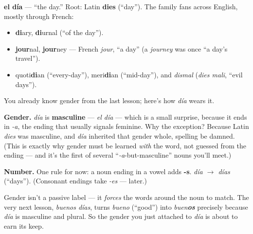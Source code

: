 \begin{cousinweb}
\textbf{el día} — \textquotedblleft{}the day.\textquotedblright{} Root: Latin \textbf{dies} (\textquotedblleft{}day\textquotedblright{}). The family fans across English, mostly through French:

\begin{itemize}
\raggedright
  \item \textbf{di}ary, \textbf{di}urnal (\textquotedblleft{}of the day\textquotedblright{}).
  \item \textbf{jour}nal, \textbf{jour}ney — French \emph{jour}, \textquotedblleft{}a day\textquotedblright{} (a \emph{journey} was once \textquotedblleft{}a day's travel\textquotedblright{}).
  \item quoti\textbf{di}an (\textquotedblleft{}every-day\textquotedblright{}), meri\textbf{di}an (\textquotedblleft{}mid-day\textquotedblright{}), and \emph{dismal} (\emph{dies mali}, \textquotedblleft{}evil days\textquotedblright{}).
\end{itemize}
\end{cousinweb}

\begin{grammarlens}[title={Its two tags: gender and number}]
You already know gender from the last lesson; here's how \emph{día} wears it.

\textbf{Gender.} \emph{día} is \textbf{masculine} — \emph{el día} — which is a small surprise, because it ends in \emph{-a}, the ending that usually signals feminine. Why the exception? Because Latin \emph{dies} was masculine, and \emph{día} inherited that gender whole, spelling be damned. (This is exactly why gender must be learned \emph{with} the word, not guessed from the ending — and it's the first of several \textquotedblleft{}\emph{-a}-but-masculine\textquotedblright{} nouns you'll meet.)

\textbf{Number.} One rule for now: a noun ending in a vowel adds \textbf{-s}. \emph{día $\to$ días} (\textquotedblleft{}days\textquotedblright{}). (Consonant endings take \emph{-es} — later.)
\end{grammarlens}

\begin{grammarlens}[title={Grammar Lens: why the gender matters next}]
Gender isn't a passive label — it \emph{forces} the words around the noun to match. The very next lesson, \emph{buenos días}, turns \emph{bueno} (\textquotedblleft{}good\textquotedblright{}) into \emph{buen\textbf{os}} precisely because \emph{día} is masculine and plural. So the gender you just attached to \emph{día} is about to earn its keep.
\end{grammarlens}

